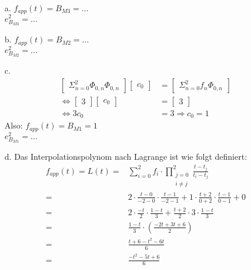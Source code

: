 	\begin{itemize}
		\item[a.]
		$f_{app}(t) = B_{M3} = \dots$\\
		$e_{B_{M3}}^2 = \dots$
		\item[b.]
		$f_{app}(t) = B_{M2} = \dots$\\
		$e_{B_{M2}}^2 = \dots$
		\item[c.]	
        \begin{align*}
            \begin{bmatrix}
                \Sigma_{n=0}^2 \Phi_{0,n} \Phi_{0,n}
            \end{bmatrix}
            \begin{bmatrix}
                c_0
            \end{bmatrix}
            &= \begin{bmatrix}
                \Sigma_{n=0}^2 f_n \Phi_{0,n}
            \end{bmatrix}
            \\
            \Longleftrightarrow \begin{bmatrix}
                3
            \end{bmatrix}
            \begin{bmatrix}
                c_0
            \end{bmatrix}
            &= \begin{bmatrix}
                3
            \end{bmatrix}
            \\
            \Longleftrightarrow 3c_0 &= 3 \Rightarrow c_0 = 1
        \end{align*}
        Also:
		$f_{app}(t) = B_{M1} = 1$\\
		$e_{B_{M1}}^2 = \dots$
		\item[d.] Das Interpolationspolynom nach Lagrange ist wie folgt definiert:
		\begin{align*}
			f_{app}(t) = L(t)	=& \sum_{i=0}^2 f_i\cdot \prod_{\substack{j=0\\i\ne j}}^2\frac{t - t_j}{t_i-t_j}\\
								=& 2\cdot\frac{t-0}{-2-0}\cdot\frac{t-1}{-2-1} + 1\cdot \frac{t+2}{0+2}\cdot\frac{t-1}{0-1} + 0\\
								=& 2\cdot\frac{-t}{2}\cdot\frac{1-t}{3} + \frac{t+2}{2}\cdot3\cdot\frac{1-t}{3}\\
								=& \frac{1-t}{3}\cdot\left(\frac{-2t+3t+6}{2}\right)\\
								=& \frac{t+6-t^2-6t}{6}\\
								=& \frac{-t^2-5t+6}{6}
		\end{align*}
	\end{itemize}
	\begin{figure}
	\end{figure}

